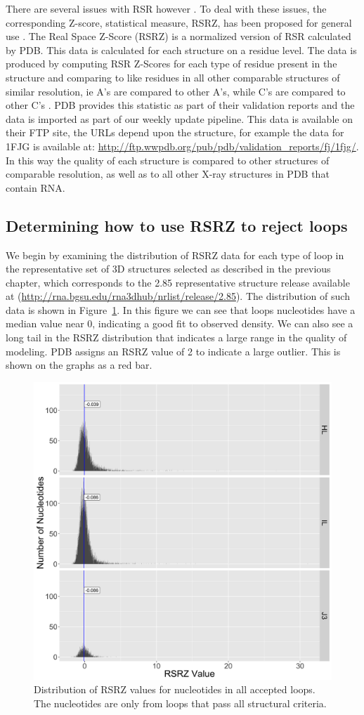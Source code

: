 There are several issues with RSR however \cite{Tickle2012}. To deal with these
issues, the corresponding Z-score, statistical measure, RSRZ, has been proposed
for general use \cite{Gore2012}. The Real Space Z-Score (RSRZ) is a normalized
version of RSR calculated by PDB. This data is calculated for each structure on
a residue level. The data is produced by computing RSR Z-Scores for each type of
residue present in the structure and comparing to like residues in all other
comparable structures of similar resolution, ie A's are compared to other A's,
while C's are compared to other C's \cite{Gore2012, Kleywegt2004a}. PDB provides
this statistic as part of their validation reports and the data is imported as
part of our weekly update pipeline. This data is available on their FTP site,
the URLs depend upon the structure, for example the data for 1FJG is available
at: \url{http://ftp.wwpdb.org/pub/pdb/validation\_reports/fj/1fjg/}. In this way
the quality of each structure is compared to other structures of comparable
resolution, as well as to all other X-ray structures in PDB that contain RNA.

\subsection{Determining how to use RSRZ to reject loops}

We begin by examining the distribution of RSRZ data for each type of loop in the
representative set of 3D structures selected as described in the previous
chapter, which corresponds to the 2.85 representative structure release
available at (\url{http://rna.bgsu.edu/rna3dhub/nrlist/release/2.85}). The
distribution of such data is shown in Figure~\ref{fig:rsrz-distribution}. In
this figure we can see that loops nucleotides have a median value near 0,
indicating a good fit to observed density. We can also see a long tail in the
RSRZ distribution that indicates a large range in the quality of modeling. PDB
assigns an RSRZ value of 2 to indicate a large outlier. This is shown on the
graphs as a red bar.

\begin{figure}
  \includegraphics[width=0.5\linewidth]{chapter-5/figs/loops/rsrz-distribution}
  \caption{Distribution of RSRZ values for nucleotides in all accepted loops.
    The nucleotides are only from loops that pass all structural criteria.}
  \label{fig:rsrz-distribution}
\end{figure}

